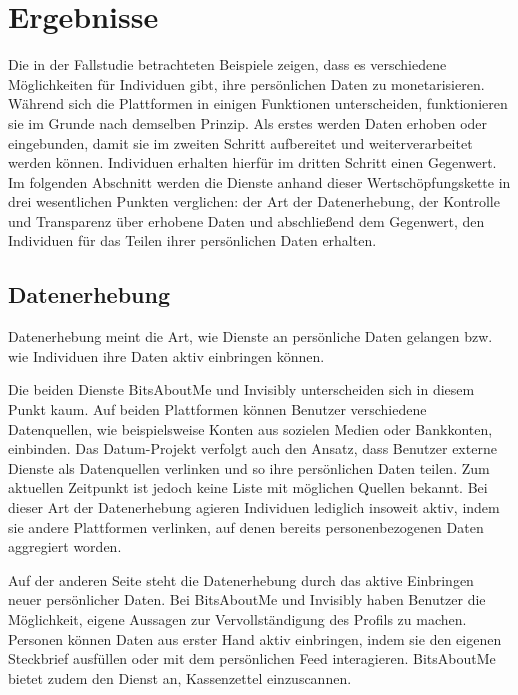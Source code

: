 \section{Ergebnisse}
Die in der Fallstudie betrachteten Beispiele zeigen, dass es verschiedene Möglichkeiten für Individuen gibt, ihre persönlichen Daten zu monetarisieren. Während sich die Plattformen in einigen Funktionen unterscheiden, funktionieren sie im Grunde nach demselben Prinzip. Als erstes werden Daten erhoben oder eingebunden, damit sie im zweiten Schritt aufbereitet und weiterverarbeitet werden können. Individuen erhalten hierfür im dritten Schritt einen Gegenwert. Im folgenden Abschnitt werden die Dienste anhand dieser Wertschöpfungskette in drei wesentlichen Punkten verglichen: der Art der Datenerhebung, der Kontrolle und Transparenz über erhobene Daten und abschließend dem Gegenwert, den Individuen für das Teilen ihrer persönlichen Daten erhalten.

\subsection{Datenerhebung}
Datenerhebung meint die Art, wie Dienste an persönliche Daten gelangen bzw. wie Individuen ihre Daten aktiv einbringen können. \newline

\noindent Die beiden Dienste BitsAboutMe und Invisibly unterscheiden sich in diesem Punkt kaum. Auf beiden Plattformen können Benutzer verschiedene Datenquellen, wie beispielsweise Konten aus sozielen Medien oder Bankkonten, einbinden. Das Datum-Projekt verfolgt auch den Ansatz, dass Benutzer externe Dienste als Datenquellen verlinken und so ihre persönlichen Daten teilen. Zum aktuellen Zeitpunkt ist jedoch keine Liste mit möglichen Quellen bekannt. Bei dieser Art der Datenerhebung agieren Individuen lediglich insoweit aktiv, indem sie andere Plattformen verlinken, auf denen bereits personenbezogenen Daten aggregiert worden. \newline

\noindent Auf der anderen Seite steht die Datenerhebung durch das aktive Einbringen neuer persönlicher Daten. Bei BitsAboutMe und Invisibly haben Benutzer die Möglichkeit, eigene Aussagen zur Vervollständigung des Profils zu machen. Personen können Daten aus erster Hand aktiv einbringen, indem sie den eigenen Steckbrief ausfüllen oder mit dem persönlichen Feed interagieren. BitsAboutMe bietet zudem den Dienst an, Kassenzettel einzuscannen. \newline

